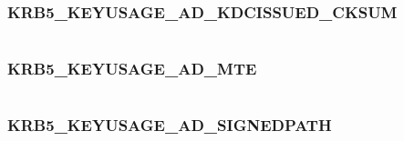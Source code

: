 \documentclass[letterpaper,10pt,english]{sphinxmanual}
\begin{document}
\subsubsection{KRB5\_KEYUSAGE\_AD\_KDCISSUED\_CKSUM}
\label{appdev/refs/macros/KRB5_KEYUSAGE_AD_KDCISSUED_CKSUM::doc}\label{appdev/refs/macros/KRB5_KEYUSAGE_AD_KDCISSUED_CKSUM:krb5-keyusage-ad-kdcissued-cksum-data}\label{appdev/refs/macros/KRB5_KEYUSAGE_AD_KDCISSUED_CKSUM:krb5-keyusage-ad-kdcissued-cksum}

\begin{fulllineitems}
\label{appdev/refs/macros/KRB5_KEYUSAGE_AD_KDCISSUED_CKSUM:KRB5_KEYUSAGE_AD_KDCISSUED_CKSUM}
\end{fulllineitems}


\begin{tabulary}{\linewidth}{|L|L|}
\hline

 & 
\\\hline
\end{tabulary}



\subsubsection{KRB5\_KEYUSAGE\_AD\_MTE}
\label{appdev/refs/macros/KRB5_KEYUSAGE_AD_MTE:krb5-keyusage-ad-mte-data}\label{appdev/refs/macros/KRB5_KEYUSAGE_AD_MTE:krb5-keyusage-ad-mte}\label{appdev/refs/macros/KRB5_KEYUSAGE_AD_MTE::doc}

\begin{fulllineitems}
\label{appdev/refs/macros/KRB5_KEYUSAGE_AD_MTE:KRB5_KEYUSAGE_AD_MTE}
\end{fulllineitems}


\begin{tabulary}{\linewidth}{|L|L|}
\hline

 & 
\\\hline
\end{tabulary}



\subsubsection{KRB5\_KEYUSAGE\_AD\_SIGNEDPATH}
\label{appdev/refs/macros/KRB5_KEYUSAGE_AD_SIGNEDPATH:krb5-keyusage-ad-signedpath-data}\label{appdev/refs/macros/KRB5_KEYUSAGE_AD_SIGNEDPATH::doc}\label{appdev/refs/macros/KRB5_KEYUSAGE_AD_SIGNEDPATH:krb5-keyusage-ad-signedpath}
\end{document}
